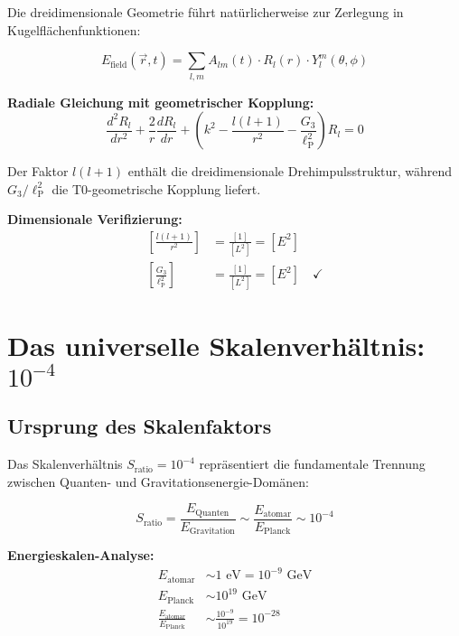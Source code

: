 \documentclass[12pt,a4paper]{report}
\newcommand{\lP}{\ell_{\text{P}}}         %
\begin{document}
	Die dreidimensionale Geometrie führt natürlicherweise zur Zerlegung in Kugelflächenfunktionen:
	
	\begin{equation}
		E_{\text{field}}(\vec{r}, t) = \sum_{l,m} A_{lm}(t) \cdot R_l(r) \cdot Y_l^m(\theta, \phi)
	\end{equation}
	
	\textbf{Radiale Gleichung mit geometrischer Kopplung:}
	\begin{equation}
		\frac{d^2 R_l}{dr^2} + \frac{2}{r}\frac{dR_l}{dr} + \left(k^2 - \frac{l(l+1)}{r^2} - \frac{G_3}{\lP^2}\right) R_l = 0
	\end{equation}
	
	Der Faktor $l(l+1)$ enthält die dreidimensionale Drehimpulsstruktur, während $G_3/\lP^2$ die T0-geometrische Kopplung liefert.
	
	\textbf{Dimensionale Verifizierung:}
	\begin{align}
		\left[\frac{l(l+1)}{r^2}\right] &= \frac{[1]}{[L^2]} = [E^2] \\
		\left[\frac{G_3}{\lP^2}\right] &= \frac{[1]}{[L^2]} = [E^2] \quad \checkmark
	\end{align}
	
	\section{Das universelle Skalenverhältnis: $10^{-4}$}
	\label{sec:universal_scale_ratio}
	
	\subsection{Ursprung des Skalenfaktors}
	\label{subsec:origin_scale_factor}
	
	Das Skalenverhältnis $S_{\text{ratio}} = 10^{-4}$ repräsentiert die fundamentale Trennung zwischen Quanten- und Gravitationsenergie-Domänen:
	
	\begin{equation}
		S_{\text{ratio}} = \frac{E_{\text{Quanten}}}{E_{\text{Gravitation}}} \sim \frac{E_{\text{atomar}}}{E_{\text{Planck}}} \sim 10^{-4}
	\end{equation}
	
	\textbf{Energieskalen-Analyse:}
	\begin{align}
		E_{\text{atomar}} &\sim 1 \text{ eV} = 10^{-9} \text{ GeV} \\
		E_{\text{Planck}} &\sim 10^{19} \text{ GeV} \\
		\frac{E_{\text{atomar}}}{E_{\text{Planck}}} &\sim \frac{10^{-9}}{10^{19}} = 10^{-28}
	\end{align}
	
\end{document}
